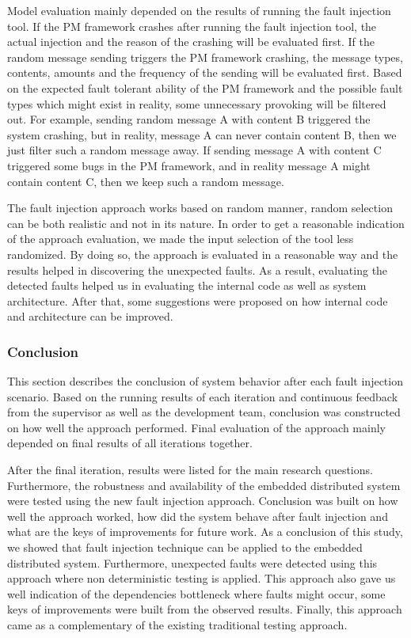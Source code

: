 Model evaluation mainly depended on the results of running the fault injection tool. If the PM framework crashes after running the fault injection tool, the actual injection and the reason of the crashing will be evaluated first. If the random message sending triggers the PM framework crashing, the message types, contents, amounts and the frequency of the sending will be evaluated first. Based on the expected fault tolerant ability of the PM framework and the possible fault types which might exist in reality, some unnecessary provoking will be filtered out. For example, sending random message A with content B triggered the system crashing, but in reality, message A can never contain content B, then we just filter such a random message away. If sending message A with content C triggered some bugs in the PM framework, and in reality message A might contain content C, then we keep such a random message. 

The fault injection approach works based on random manner, random selection can be both realistic and not in its nature. In order to get a reasonable indication of the approach evaluation, we made the input selection of the tool less randomized. By doing so, the approach is evaluated in a reasonable way and the results helped in discovering the unexpected faults. As a result, evaluating the detected faults helped us in evaluating the internal code as well as system architecture. After that, some suggestions were proposed on how internal code and architecture can be improved.     


\subsubsection{Conclusion}
This section describes the conclusion of system behavior after each fault injection scenario. Based on the running results of each iteration and continuous feedback from the supervisor as well as the development team, conclusion was constructed on how well the approach performed. Final evaluation of the approach mainly depended on final results of all iterations together.  

After the final iteration, results were listed for the main research questions. Furthermore, the robustness and availability of the embedded distributed system were tested using the new fault injection approach. Conclusion was built on how well the approach worked, how did the system behave after fault injection and what are the keys of improvements for future work. As a conclusion of this study, we showed that fault injection technique can be applied to the embedded distributed system. Furthermore, unexpected faults were detected using this approach where non deterministic testing is applied. This approach also gave us well indication of the dependencies bottleneck where faults might occur, some keys of improvements were built from the observed results. Finally, this approach came as a complementary of the existing traditional testing approach.     

